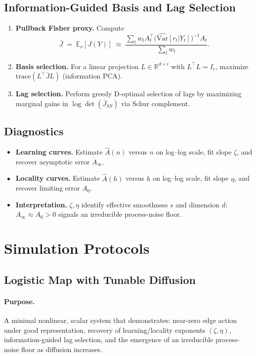 \documentclass[11pt]{article}
\newcommand{\1}{\mathbf{1}}
\begin{document}
\subsection{Information-Guided Basis and Lag Selection}
\begin{enumerate}
    \item \textbf{Pullback Fisher proxy.} Compute
    \[
        \bar{J} \;=\; \mathbb{E}_\nu[J(Y)] 
        \;\approx\; \frac{\sum_t w_t A_t^\top \big(\widehat{\mathrm{Var}}[r_t|Y_t]\big)^{-1} A_t}{\sum_t w_t}.
    \]
    \item \textbf{Basis selection.} For a linear projection $L \in \mathbb{R}^{d\times r}$ with $L^\top L = I_r$, maximize $\mathrm{trace}(L^\top \bar J L)$ (information PCA).
    \item \textbf{Lag selection.} Perform greedy D-optimal selection of lags by maximizing marginal gains in $\log \det (\bar J_{SS})$ via Schur complement.
\end{enumerate}

\subsection{Diagnostics}
\begin{itemize}
    \item \textbf{Learning curves.} Estimate $\hat A(n)$ versus $n$ on log--log scale, fit slope $\zeta$, and recover asymptotic error $A_\infty$.
    \item \textbf{Locality curves.} Estimate $\hat A(h)$ versus $h$ on log--log scale, fit slope $\eta$, and recover limiting error $A_0$.
    \item \textbf{Interpretation.} $\zeta,\eta$ identify effective smoothness $s$ and dimension $d$; $A_\infty \approx A_0 > 0$ signals an irreducible process-noise floor.
\end{itemize}

\section{Simulation Protocols}
\label{app:sim}

\subsection{Logistic Map with Tunable Diffusion}

\paragraph{Purpose.}
A minimal nonlinear, scalar system that demonstrates: near-zero edge action under good representation, recovery of learning/locality exponents $(\zeta,\eta)$, information-guided lag selection, and the emergence of an irreducible process-noise floor as diffusion increases.
\end{document}
